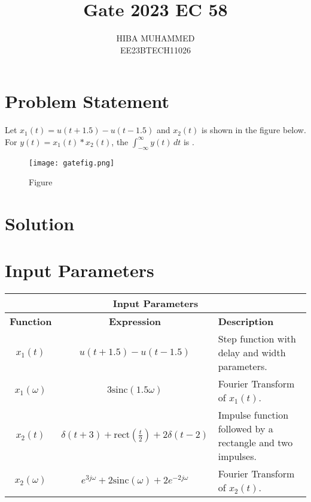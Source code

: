 \documentclass[journal,12pt,onecolumn]{IEEEtran}
\theoremstyle{remark}
\begin{document}
\let\vec\mathbf



\title{Gate 2023 EC 58}
\author{HIBA MUHAMMED\\
        EE23BTECH11026}
\maketitle

\section*{Problem Statement}
Let $x_1(t) = u(t + 1.5) - u(t - 1.5)$ and $x_2(t)$ is shown in the figure below. For $y(t) = x_1(t) * x_2(t)$, the $\int_{-\infty}^{\infty} y(t) \, dt$ is \underline{\hspace{2cm}}.

\begin{figure}[htbp]
    \centering
    \texttt{[image: gatefig.png]}
    \caption{Figure}
    \label{fig:graph}
\end{figure}

\section*{Solution}
\section*{Input Parameters}
\begin{table}[htbp]
    \centering
    \begin{tabular}{|c|c|p{6cm}|}
        \hline
        \multicolumn{3}{|c|}{\textbf{Input Parameters}} \\
        \hline
        \textbf{Function} & \textbf{Expression} & \textbf{Description} \\
        \hline
        $x_1(t)$ & $u(t + 1.5) - u(t - 1.5)$ & Step function with delay and width parameters. \\
        $x_1(\omega)$ & $3\text{sinc}(1.5\omega)$ & Fourier Transform of $x_1(t)$. \\
        $x_2(t)$ & $\delta(t + 3) + \text{rect}\left(\frac{t}{2}\right) + 2\delta(t - 2)$ & Impulse function followed by a rectangle and two impulses. \\
        $x_2(\omega)$ & $e^{3j\omega} + 2\text{sinc}(\omega) + 2e^{-2j\omega}$ & Fourier Transform of $x_2(t)$. \\
        \hline
    \end{tabular}
\end{table}
\end{document}
